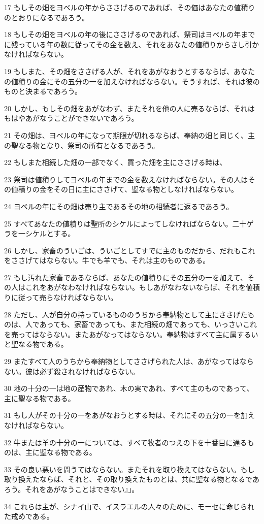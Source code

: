 \par 17 もしその畑をヨベルの年からささげるのであれば、その価はあなたの値積りのとおりになるであろう。
\par 18 もしその畑をヨベルの年の後にささげるのであれば、祭司はヨベルの年までに残っている年の数に従ってその金を数え、それをあなたの値積りからさし引かなければならない。
\par 19 もしまた、その畑をささげる人が、それをあがなおうとするならば、あなたの値積りの金にその五分の一を加えなければならない。そうすれば、それは彼のものと決まるであろう。
\par 20 しかし、もしその畑をあがなわず、またそれを他の人に売るならば、それはもはやあがなうことができないであろう。
\par 21 その畑は、ヨベルの年になって期限が切れるならば、奉納の畑と同じく、主の聖なる物となり、祭司の所有となるであろう。
\par 22 もしまた相続した畑の一部でなく、買った畑を主にささげる時は、
\par 23 祭司は値積りしてヨベルの年までの金を数えなければならない。その人はその値積りの金をその日に主にささげて、聖なる物としなければならない。
\par 24 ヨベルの年にその畑は売り主であるその地の相続者に返るであろう。
\par 25 すべてあなたの値積りは聖所のシケルによってしなければならない。二十ゲラを一シケルとする。
\par 26 しかし、家畜のういごは、ういごとしてすでに主のものだから、だれもこれをささげてはならない。牛でも羊でも、それは主のものである。
\par 27 もし汚れた家畜であるならば、あなたの値積りにその五分の一を加えて、その人はこれをあがなわなければならない。もしあがなわないならば、それを値積りに従って売らなければならない。
\par 28 ただし、人が自分の持っているもののうちから奉納物として主にささげたものは、人であっても、家畜であっても、また相続の畑であっても、いっさいこれを売ってはならない。またあがなってはならない。奉納物はすべて主に属するいと聖なる物である。
\par 29 またすべて人のうちから奉納物としてささげられた人は、あがなってはならない。彼は必ず殺されなければならない。
\par 30 地の十分の一は地の産物であれ、木の実であれ、すべて主のものであって、主に聖なる物である。
\par 31 もし人がその十分の一をあがなおうとする時は、それにその五分の一を加えなければならない。
\par 32 牛または羊の十分の一については、すべて牧者のつえの下を十番目に通るものは、主に聖なる物である。
\par 33 その良い悪いを問うてはならない。またそれを取り換えてはならない。もし取り換えたならば、それと、その取り換えたものとは、共に聖なる物となるであろう。それをあがなうことはできない』」。
\par 34 これらは主が、シナイ山で、イスラエルの人々のために、モーセに命じられた戒めである。


